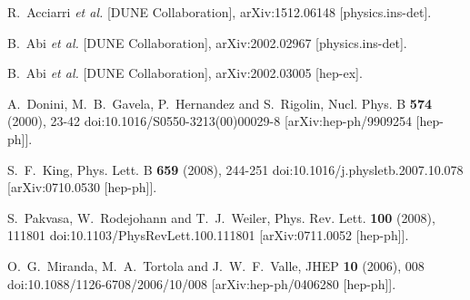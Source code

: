 \begin{thebibliography}{00}
  R.~Acciarri {\it et al.} [DUNE Collaboration],
  arXiv:1512.06148 [physics.ins-det].
  
  B.~Abi {\it et al.} [DUNE Collaboration],
  arXiv:2002.02967 [physics.ins-det].
  
  B.~Abi {\it et al.} [DUNE Collaboration],
  arXiv:2002.03005 [hep-ex].
  
  
  
  
  
  
  

A.~Donini, M.~B.~Gavela, P.~Hernandez and S.~Rigolin,
Nucl. Phys. B \textbf{574} (2000), 23-42
doi:10.1016/S0550-3213(00)00029-8
[arXiv:hep-ph/9909254 [hep-ph]].

  
  
S.~F.~King,
Phys. Lett. B \textbf{659} (2008), 244-251
doi:10.1016/j.physletb.2007.10.078
[arXiv:0710.0530 [hep-ph]].




S.~Pakvasa, W.~Rodejohann and T.~J.~Weiler,
Phys. Rev. Lett. \textbf{100} (2008), 111801
doi:10.1103/PhysRevLett.100.111801
[arXiv:0711.0052 [hep-ph]].
  
O.~G.~Miranda, M.~A.~Tortola and J.~W.~F.~Valle,
JHEP \textbf{10} (2006), 008
doi:10.1088/1126-6708/2006/10/008
[arXiv:hep-ph/0406280 [hep-ph]]. 




\end{thebibliography}
